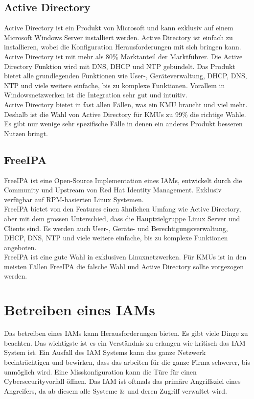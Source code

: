 \subsection{Active Directory}
Active Directory ist ein Produkt von Microsoft und kann exklusiv auf einem Microsoft Windows Server installiert werden. Active Directory ist einfach zu installieren, wobei die Konfiguration Herausforderungen mit sich bringen kann.\\

Active Directory ist mit mehr als 80\% Marktanteil der Marktführer. Die Active Directory Funktion wird mit DNS, DHCP und NTP gebündelt. Das Produkt bietet alle grundlegenden Funktionen wie User-, Geräteverwaltung, DHCP, DNS, NTP und viele weitere einfache, bis zu komplexe Funktionen. Vorallem in Windowsnetzwerken ist die Integration sehr gut und intuitiv.\\

Active Directory bietet in fast allen Fällen, was ein KMU braucht und viel mehr. Deshalb ist die Wahl von Active Directory für KMUs zu 99\% die richtige Wahle. Es gibt nur wenige sehr spezifische Fälle in denen ein anderes Produkt besseren Nutzen bringt. 


\subsection{FreeIPA}
FreeIPA ist eine Open-Source Implementation eines IAMs, entwickelt durch die Community und Upstream von Red Hat Identity Management. Exklusiv verfügbar auf RPM-basierten Linux Systemen.\\

FreeIPA bietet von den Features einen ähnlichen Umfang wie Active Directory, aber mit dem grossen Unterschied, dass die Hauptzielgruppe Linux Server und Clients sind. Es werden auch User-, Geräte- und Berechtigungsverwaltung, DHCP, DNS, NTP und viele weitere einfache, bis zu komplexe Funktionen angeboten.\\

FreeIPA ist eine gute Wahl in exklusiven Linuxnetzwerken. Für KMUs ist in den meisten Fällen FreeIPA die falsche Wahl und Active Directory sollte vorgezogen werden.


\section{Betreiben eines IAMs}
Das betreiben eines IAMs kann Herausforderungen bieten.
Es gibt viele Dinge zu beachten.
Das wichtigste ist es ein Verständnis zu erlangen wie kritisch das IAM System ist.
Ein Ausfall des IAM Systems kann das ganze Netzwerk beeinträchtigen und bewirken, dass das arbeiten für die ganze Firma schwerer, bis unmöglich wird.
Eine Misskonfiguration kann die Türe für einen Cybersecurityvorfall öffnen.
Das IAM ist oftmals das primäre Angriffsziel eines Angreifers, da ab diesem alle Systeme \& und deren Zugriff verwaltet wird.\\

